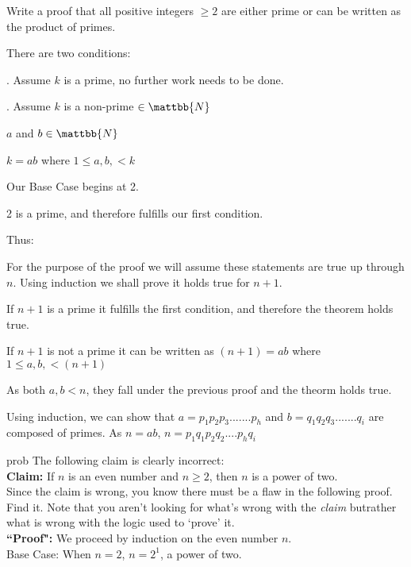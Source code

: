 \documentclass[12pt]{article}
\begin{document}
Write a proof that all positive integers $\ge 2$ are either prime or can be written as the product of primes.\vspace{0.5in}

There are two conditions:

. Assume $k$ is a prime, no further work needs to be done.

. Assume $k$ is a non-prime $\in \mattbb{N}$

$a$ and $b \in \mattbb{N}$

$k = ab$ where $1 \leq a, b, < k$\vspace{0.2in}


Our Base Case begins at 2.

2 is a prime, and therefore fulfills our first condition.\vspace{0.2in}

Thus:

For the purpose of the proof we will assume these statements are true up through $n$. Using induction we shall prove it holds true for $n+1$.

If $n+1$ is a prime it fulfills the first condition, and therefore the theorem holds true.

If $n+1$ is not a prime it can be written as $(n+1) = ab$ where $1 \leq a, b, < (n+1)$

As both $a, b < n$, they fall under the previous proof and the theorm holds true.

Using induction, we can show that
$a = p_1p_2p_3.......p_h$
and
$b = q_1q_2q_3.......q_i$ are composed of primes. As $n = ab$,  $n = p_1q_1p_2q_2....p_hq_i$\vspace{0.5in}


prob The following claim is clearly incorrect:\\

{\bf Claim:} If $n$ is an even number and $n\ge 2$, then $n$ is a power of two.\\

Since the claim is wrong, you know there must be a flaw in the following proof. Find it. Note that you aren't looking for what's wrong with the \emph{claim} butrather what is wrong with the logic used to `prove' it.\\

{\bf ``Proof":} We proceed by induction on the even number $n$. \\

Base Case: When $n=2$, $n=2^1$, a power of two.\\
\end{document}
